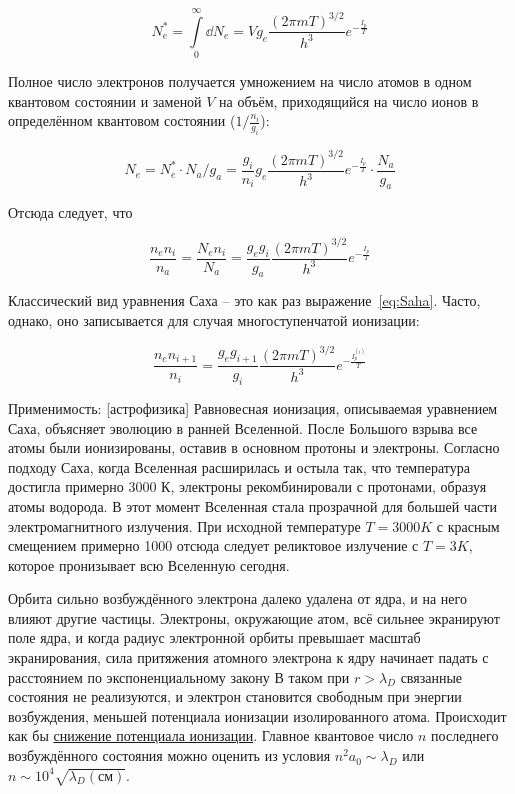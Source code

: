 \documentclass[10pt, a4paper]{article}
\begin{document}
\begin{equation*}
	N_e^{*} = \int\limits_{0}^{\infty} \dd N_e = Vg_e\frac{(2\pi mT)^{3/2}}{h^3}e^{-\frac{I_p}{T}}
\end{equation*}

Полное число электронов получается умножением на число атомов в одном квантовом состоянии и заменой $V$ на объём, приходящийся на число ионов в определённом квантовом состоянии ($1/\frac{n_i}{g_i}$):

\begin{equation*}
	N_e = N_e^{*} \cdot N_a/g_a = \frac{g_i}{n_i} g_e\frac{(2\pi mT)^{3/2}}{h^3}e^{-\frac{I_p}{T}} \cdot \frac{N_a}{g_a}
\end{equation*}

Отсюда следует, что

\begin{equation} \label{eq:Saha}
	\frac{n_en_i}{n_a} = \frac{N_en_i}{N_a} = \frac{g_eg_i}{g_a} \frac{(2\pi mT)^{3/2}}{h^3}e^{-\frac{I_p}{T}}
\end{equation}

Классический вид уравнения Саха -- это как раз выражение~\eqref{eq:Saha}. Часто, однако, оно записывается для случая многоступенчатой ионизации:

\begin{equation*}
	\frac{n_en_{i+1}}{n_i} = \frac{g_eg_{i+1}}{g_i} \frac{(2\pi mT)^{3/2}}{h^3}e^{-\frac{I_p^{(i)}}{T}}
\end{equation*}

Применимость: [астрофизика] Равновесная ионизация, описываемая уравнением Саха, объясняет эволюцию в ранней Вселенной. После Большого взрыва все атомы были ионизированы, оставив в основном протоны и электроны. Согласно подходу Саха, когда Вселенная расширилась и остыла так, что температура достигла примерно 3000 К, электроны рекомбинировали с протонами, образуя атомы водорода. В этот момент Вселенная стала прозрачной для большей части электромагнитного излучения. При исходной температуре $T = 3000 K$ с красным смещением примерно 1000 отсюда следует реликтовое излучение с $T = 3 K$, которое пронизывает всю Вселенную сегодня. 

Орбита сильно возбуждённого электрона далеко удалена от ядра, и на него влияют другие частицы. Электроны, окружающие атом, всё сильнее экранируют поле ядра, и когда радиус электронной орбиты превышает масштаб экранирования, сила притяжения атомного электрона к ядру начинает падать с расстоянием по экспоненциальному закону В таком при $r>\lambda_D$ связанные состояния не реализуются, и электрон становится свободным при энергии возбуждения, меньшей потенциала ионизации изолированного атома. Происходит как бы \uline{снижение потенциала ионизации}. Главное квантовое число $n$ последнего возбуждённого состояния можно оценить из условия $n^2a_0 \sim \lambda_D$ или $n \sim 10^4\sqrt{\lambda_D(\text{см})}$.
\end{document}
